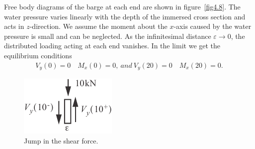 \documentclass{AeroStructure-ERJohnson}
\begin{document}
\begin{example*}
Free body diagrams of the barge at each end are shown in figure~\ref{fig4.8}. The water pressure varies linearly with the depth of the immersed cross section and acts in $z$-direction. We assume the moment about the $x$-axis caused by the water pressure is small and can be neglected. As the infinitesimal distance $\varepsilon \rightarrow 0$, the distributed loading acting at each end vanishes. In the limit we get the equilibrium conditions
{\def\thefigure{4.8}
}
\vspace*{-2\baselineskip}
\begin{align}\label{ex4.2c}
V_{y}(0)=0 \quad M_{x}(0)=0,\ and\ V_{y}(20)=0 \quad M_{x}(20)=0.
\end{align}
\pagebreak
\begin{figure}
\includegraphics{Figure_4-9.pdf}
\caption{Jump in the shear force.\label{fig4.9}}
\end{figure}

\end{example*}
\end{document}
